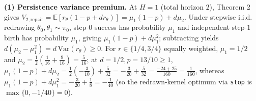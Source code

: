 \documentclass[11pt,letterpaper]{article}
\begin{document}
\textbf{(1) Persistence variance premium.} At \(H = 1\) (total horizon
\(2\)), Theorem 2 gives
\(V_{2,\mathrm{repair}} = \mathbb{E}[r_\theta(1 - p + d r_\theta)] = \mu_1(1 - p) + d\mu_2\).
Under stepwise i.i.d. redrawing \(\theta_0, \theta_1 \sim \pi_0\),
step-\(0\) success has probability \(\mu_1\) and independent step-\(1\)
birth has probability \(\mu_1\), giving \(\mu_1(1 - p) + d\mu_1^2\);
subtracting yields
\(d(\mu_2 - \mu_1^2) = d\,\mathrm{Var}(r_\theta) \ge 0\). For
\(r \in \{1/4, 3/4\}\) equally weighted, \(\mu_1 = 1/2\) and
\(\mu_2 = \frac{1}{2}(\frac{1}{16} + \frac{9}{16}) = \frac{5}{16}\); at
\(d = 1/2, p = 13/10 \ge 1\),
\(\mu_1(1-p) + d\mu_2 = \frac{1}{2}(-\frac{3}{10}) + \frac{5}{32} = -\frac{3}{20} + \frac{5}{32} = \frac{-24 + 25}{160} = \frac{1}{160}\),
whereas
\(\mu_1(1-p) + d\mu_1^2 = -\frac{3}{20} + \frac{1}{8} = -\frac{1}{40}\)
(so the redrawn-kernel optimum via \texttt{stop} is
\(\max\{0, -1/40\} = 0\)).
\end{document}

